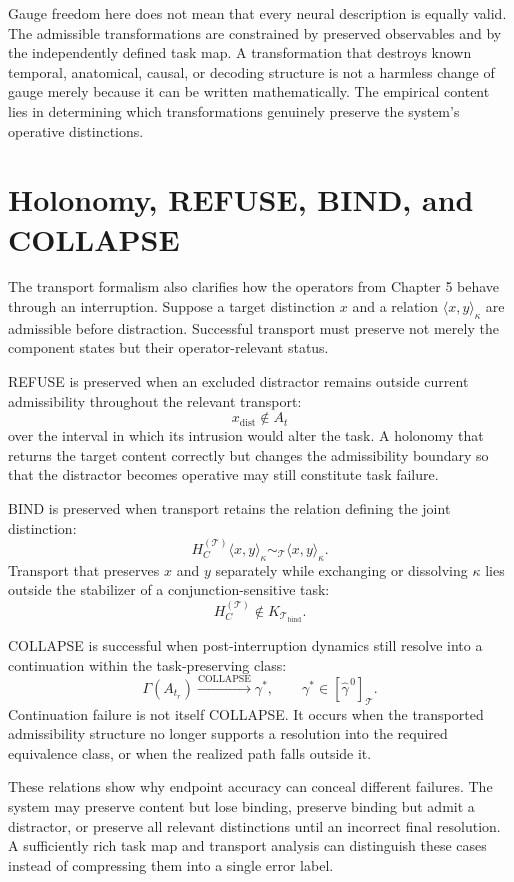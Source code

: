 \documentclass[11pt]{book}
\begin{document}
Gauge freedom here does not mean that every neural description is equally valid. The admissible transformations are constrained by preserved observables and by the independently defined task map. A transformation that destroys known temporal, anatomical, causal, or decoding structure is not a harmless change of gauge merely because it can be written mathematically. The empirical content lies in determining which transformations genuinely preserve the system's operative distinctions.

\section*{Holonomy, REFUSE, BIND, and COLLAPSE}

The transport formalism also clarifies how the operators from Chapter 5 behave through an interruption. Suppose a target distinction $x$ and a relation $\langle x,y\rangle_\kappa$ are admissible before distraction. Successful transport must preserve not merely the component states but their operator-relevant status.

REFUSE is preserved when an excluded distractor remains outside current admissibility throughout the relevant transport:
\[
x_{\mathrm{dist}}\notin A_t
\]
over the interval in which its intrusion would alter the task. A holonomy that returns the target content correctly but changes the admissibility boundary so that the distractor becomes operative may still constitute task failure.

BIND is preserved when transport retains the relation defining the joint distinction:
\[
H_C^{(\mathcal T)}
\langle x,y\rangle_\kappa
\sim_{\mathcal T}
\langle x,y\rangle_\kappa.
\]
Transport that preserves $x$ and $y$ separately while exchanging or dissolving $\kappa$ lies outside the stabilizer of a conjunction-sensitive task:
\[
H_C^{(\mathcal T)}\notin K_{\mathcal T_{\mathrm{bind}}}.
\]

COLLAPSE is successful when post-interruption dynamics still resolve into a continuation within the task-preserving class:
\[
\Gamma(A_{t_r})
\xrightarrow{\operatorname{COLLAPSE}}
\gamma^{*},
\qquad
\gamma^{*}\in[\widehat{\gamma}^{\,0}]_{\mathcal T}.
\]
Continuation failure is not itself COLLAPSE. It occurs when the transported admissibility structure no longer supports a resolution into the required equivalence class, or when the realized path falls outside it.

These relations show why endpoint accuracy can conceal different failures. The system may preserve content but lose binding, preserve binding but admit a distractor, or preserve all relevant distinctions until an incorrect final resolution. A sufficiently rich task map and transport analysis can distinguish these cases instead of compressing them into a single error label.
\end{document}
